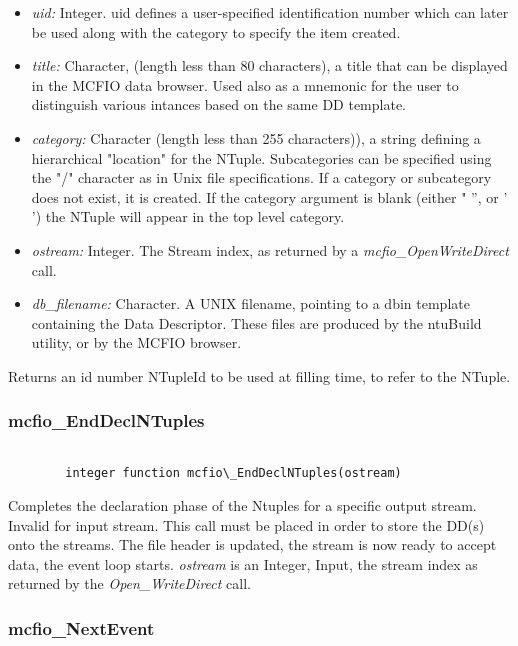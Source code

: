 \begin{itemize}
\item {\em uid:} Integer. uid defines a user-specified identification number 
 which can later be used along with the category to specify the item created.
\item {\em title:} Character, (length less than 80 characters), a title that can be displayed
in the MCFIO data browser.  Used also as a mnemonic for the user to distinguish
various intances based on the same DD template.
\item {\em category:} Character (length less than 255 characters)), a string defining a 
hierarchical "location" for the NTuple. Subcategories can be
specified using the "/" character as in Unix file specifications. 
If a category or subcategory does not exist, it is created. 
If the category argument is blank (either " '', or ' ') the NTuple will
appear in the top level category.  
\item {\em ostream:} Integer. The Stream index, as returned by a
{\em mcfio\_OpenWriteDirect}  call.
\item{\em db\_filename:} Character. A UNIX filename, pointing to a dbin template 
containing the Data Descriptor.  These files are produced by 
the ntuBuild utility, or by the MCFIO browser. 
\end{itemize}


    Returns an id number NTupleId to be used at filling time, to refer to the NTuple.
	
\subsubsection{mcfio\_EndDeclNTuples}

\begin{verbatim}

        integer function mcfio\_EndDeclNTuples(ostream)

\end{verbatim}

Completes the declaration phase of the Ntuples for a specific output stream.
Invalid for input stream.  This call must be placed in order to store
the DD(s) onto the streams.  The file header is updated, the stream is 
now ready to accept data, the event loop starts.  {\em ostream} is 
an Integer, Input, the stream index as returned by the 
{\em Open\_WriteDirect} call. 



\subsubsection{mcfio\_NextEvent}


